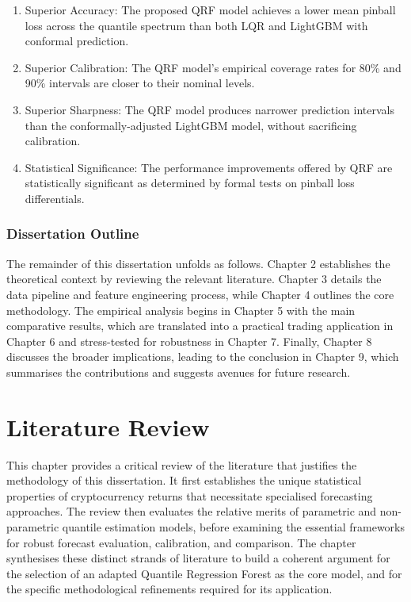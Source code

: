 \documentclass[
  a4paper,
  DIV=11,
  numbers=noendperiod]{scrreprt}
\begin{document}
\begin{enumerate}
\def\labelenumi{\arabic{enumi}.}
\item
  Superior Accuracy: The proposed QRF model achieves a lower mean
  pinball loss across the quantile spectrum than both LQR and LightGBM
  with conformal prediction.
\item
  Superior Calibration: The QRF model's empirical coverage rates for
  80\% and 90\% intervals are closer to their nominal levels.
\item
  Superior Sharpness: The QRF model produces narrower prediction
  intervals than the conformally-adjusted LightGBM model, without
  sacrificing calibration.
\item
  Statistical Significance: The performance improvements offered by QRF
  are statistically significant as determined by formal tests on pinball
  loss differentials.
\end{enumerate}

\subsection{Dissertation Outline}\label{dissertation-outline}

The remainder of this dissertation unfolds as follows. Chapter 2
establishes the theoretical context by reviewing the relevant
literature. Chapter 3 details the data pipeline and feature engineering
process, while Chapter 4 outlines the core methodology. The empirical
analysis begins in Chapter 5 with the main comparative results, which
are translated into a practical trading application in Chapter 6 and
stress-tested for robustness in Chapter 7. Finally, Chapter 8 discusses
the broader implications, leading to the conclusion in Chapter 9, which
summarises the contributions and suggests avenues for future research.


\chapter{Literature Review}\label{literature-review}

This chapter provides a critical review of the literature that justifies
the methodology of this dissertation. It first establishes the unique
statistical properties of cryptocurrency returns that necessitate
specialised forecasting approaches. The review then evaluates the
relative merits of parametric and non-parametric quantile estimation
models, before examining the essential frameworks for robust forecast
evaluation, calibration, and comparison. The chapter synthesises these
distinct strands of literature to build a coherent argument for the
selection of an adapted Quantile Regression Forest as the core model,
and for the specific methodological refinements required for its
application.
\end{document}
